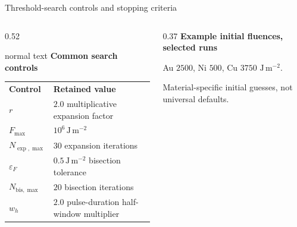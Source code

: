 \documentclass[aspectratio=169,10pt]{beamer}
\begin{document}
\begin{frame}[t]{Threshold-search controls and stopping criteria}
  \hypertarget{supp:threshold-controls}{}
  \vspace{-0.18cm}\noindent\hfill
  \hspace{0.08cm}\GVBackupIndexButton\par
  \vspace{0.13cm}
  \begin{columns}[T,totalwidth=0.94\textwidth]
    \begin{column}{0.52\textwidth}
      \begin{beamercolorbox}[wd=\linewidth,sep=0.55em]{normal text}
        \small\textbf{\color{GVTeal}Common search controls}\par
        \vspace{0.10cm}
        \scriptsize
        \renewcommand{\arraystretch}{1.16}
        \begin{tabular}{@{}ll@{}}
          \rowcolor{GVTealTint}
          \textbf{Control} & \textbf{Retained value} \\
          \(r\) & \(2.0\) multiplicative expansion factor \\
          \(F_{\max}\) & \(10^{6}\,\mathrm{J\,m^{-2}}\) \\
          \(N_{\exp,\max}\) & \(30\) expansion iterations \\
          \(\varepsilon_F\) & \(0.5\,\mathrm{J\,m^{-2}}\) bisection tolerance \\
          \(N_{\mathrm{bis},\max}\) & \(20\) bisection iterations \\
          \(w_h\) & \(2.0\) pulse-duration half-window multiplier \\
        \end{tabular}
      \end{beamercolorbox}
    \end{column}
    \begin{column}{0.37\textwidth}
      \scriptsize
      \textbf{\color{GVCapacityPurple}Example initial fluences, selected runs}\par
      \vspace{0.06cm}
      Au \(2500\), Ni \(500\), Cu \(3750\) \(\mathrm{J\,m^{-2}}\).\par
      \color{GVSlate}Material-specific initial guesses, not universal defaults.\par
      \vspace{0.18cm}

\end{column}
\end{columns}
\end{frame}
\end{document}
